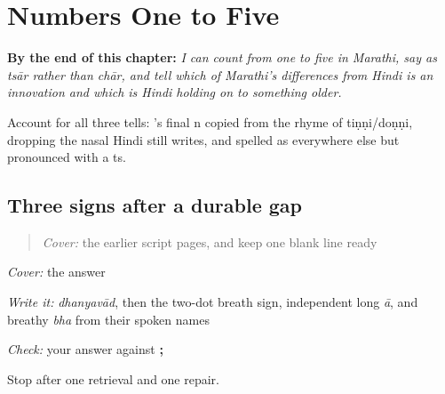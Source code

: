 
\chapter{Numbers One to Five}
\label{ch:numbers-one-to-five}

\begin{chapteropening}
\textbf{By the end of this chapter:} \emph{I can count from one to five in Marathi, say  as tsār rather than chār, and tell which of Marathi's differences from Hindi is an innovation and which is Hindi holding on to something older.}

Account for all three tells: 's final n copied from the rhyme of tiṇṇi/doṇṇi,  dropping the nasal Hindi  still writes, and  spelled as everywhere else but pronounced with a ts.
\end{chapteropening}

\section[\texorpdfstring{\mr{ः} / \mr{आ} / \mr{भ} (visarga / aa / bha)}{ः / आ / भ (visarga / aa / bha)}]{Three signs after a durable gap}

\label{lesson:MR-R09-script-a-r3}



\begin{quote}
\emph{Cover:} the earlier script pages, and keep one blank line ready
\end{quote}

\begin{tcolorbox}[breakable,colback=teal!4,colframe=teal!35!black,title={Before you move on}]
\emph{Cover:} the answer

\emph{Write it:} \emph{dhanyavād}, then the two-dot breath sign, independent long \emph{ā}, and breathy \emph{bha} from their spoken names

\emph{Check:} your answer against \textbf{;   }

Stop after one retrieval and one repair.
\end{tcolorbox}
